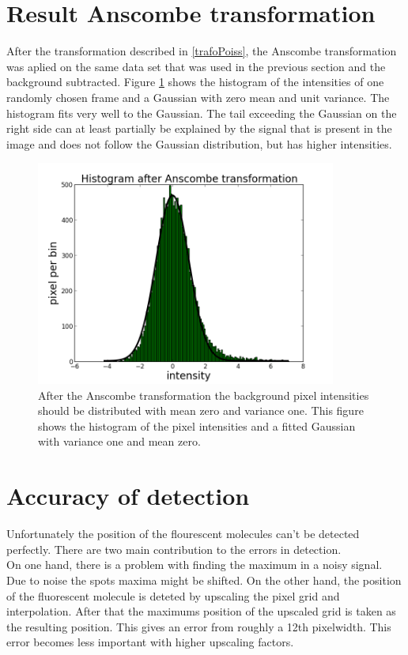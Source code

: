 \section{Result Anscombe transformation}
After the transformation described in \ref{trafoPoiss}, the Anscombe transformation was aplied on the same data set that was used in the previous section and the background subtracted. Figure \ref{isitAnscombe} shows the histogram of the intensities of one randomly chosen frame and a Gaussian with zero mean and unit variance. The histogram fits very well to the Gaussian. The tail exceeding the Gaussian on the right side can at least partially be explained by the signal that is present in the image and does not follow the Gaussian distribution, but has higher intensities.
\begin{figure}
\centering
\includegraphics[width = 0.88\textwidth]{pictures/anscombeAndFit.png}
	 \caption{After the Anscombe transformation the background pixel intensities should be distributed with mean zero and variance one. This figure shows the histogram of the pixel intensities and a fitted Gaussian with variance one and mean zero.}
	\label{isitAnscombe}
\end{figure}

\section{Accuracy of detection}
Unfortunately the position of the flourescent molecules can't be detected
perfectly. There are two main contribution to the errors in detection.\\
On one hand, there is a problem with finding the maximum in a noisy signal. Due to
noise the spots maxima might be shifted.\newline
On the other hand, the position of the fluorescent molecule is deteted by upscaling the pixel grid and interpolation.
After that the maximums position of the upscaled grid is taken as the resulting
position. This gives an error from roughly a 12th pixelwidth. This error becomes less important with higher upscaling factors.\newline

